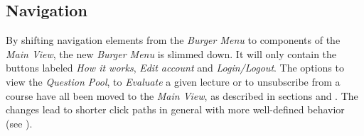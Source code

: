 \subsection{Navigation}
By shifting navigation elements from the \emph{Burger Menu} to components of the \emph{Main View}, the new \emph{Burger Menu} is slimmed down.
It will only contain the buttons labeled \emph{How it works}, \emph{Edit account} and \emph{Login/Logout}. The options to view the \emph{Question Pool}, to \emph{Evaluate} a given lecture or to unsubscribe from a course have all been moved to the \emph{Main View}, as described in sections  and .
The changes lead to shorter click paths in general with more well-defined behavior (see \todogrf).


